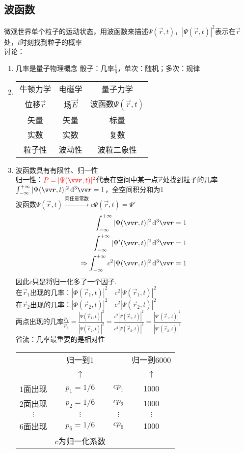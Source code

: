 \documentclass{article}
\begin{document}
\subsection{波函数}
微观世界单个粒子的运动状态，用波函数来描述$\Psi(\vec{r},t)$，$|\Psi(\vec{r},t)|^2$表示在$\vec{r}$处，$t$时刻找到粒子的概率\\
讨论：\begin{enumerate}[label=(\arabic*)]
	\item 几率是量子物理概念
				骰子：几率$\frac{1}{6}$，单次：随机；多次：规律
	\item \begin{tabular}{ccc}
					牛顿力学 & 电磁学 & 量子力学 \\
					位移$\vec{r}$ & 场$\vec{E}$ & 波函数$\Psi(\vec{r},t)$ \\
					矢量 & 矢量 & 标量 \\
					实数 & 实数 & 复数 \\
					粒子性 & 波动性 & 波粒二象性
				\end{tabular}
	\item 波函数具有有限性、归一性\\
				归一性：$\red P=|\Psi(\vec{r},t)|^2$代表在空间中某一点$\vec{r}$处找到粒子的几率\\
				$\int_{-\infty}^{+\infty}|\Psi(\vec{r},t)|^2\dif^3\vec{r} = 1$，全空间积分和为1\\
				波函数$\Psi(\vec{r},t)\xrightarrow{\text{乘任意常数}}c\Psi(\vec{r},t) = \Psi'$
				\[
					\begin{aligned}
						\int_{-\infty}^{+\infty}|\Psi(\vec{r},t)|^2\dif^3\vec{r} &= 1\\
						\int_{-\infty}^{+\infty}|\Psi'(\vec{r},t)|^2\dif^3\vec{r} &= 1\\
						\Rightarrow \int_{-\infty}^{+\infty}c^2|\Psi(\vec{r},t)|^2\dif^3\vec{r} &= 1
					\end{aligned}
				\]
				因此$c$只是将归一化多了一个因子.\\
				在$\vec{r}_1$出现的几率：$|\Phi(\vec{r}_1,t)|^2\quad c^2|\Psi(\vec{r}_1,t)|^2$\\
				在$\vec{r}_2$出现的几率：$|\Phi(\vec{r}_2,t)|^2\quad c^2|\Psi(\vec{r}_2,t)|^2$\\
				两点出现的几率$\frac{p_1}{p_2} = \frac{|\Psi(\vec{r}_1,t)|^2}{|\Psi(\vec{r}_2,t)|^2} = \frac{c^2|\Psi(\vec{r}_1,t)|^2}{c^2|\Psi(\vec{r}_2,t)|^2} = \frac{|\Psi'(\vec{r}_1,t)|^2}{|\Psi'(\vec{r}_2,t)|^2}$\\
				省流：几率最重要的是{\red 相对性}\\
				\begin{tabular}{cccc}
					~ & 归一到1 & ~ & 归一到6000 \\
					~ & $\uparrow$ & ~ & $\uparrow$ \\
					1面出现 & $p_1=1/6$ & $cp_1$ & 1000 \\
					2面出现 & $p_2=1/6$ & $cp_2$ & 1000 \\
					$\vdots$ & $\vdots$ & $\vdots$ & $\vdots$ \\
					6面出现 & $p_6=1/6$ & $cp_6$ & 1000 \\
					& $c$为归一化系数
				\end{tabular}
\end{enumerate}
\end{document}
